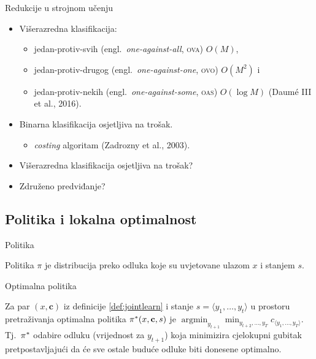 \documentclass{beamer}
\makeatletter
\newcommand{\engla}[2]{(engl.~\emph{#1}, \textsc{#2})}
\def\@fnsymbol#1{\ensuremath{\ifcase#1\or *\or \dagger\or \ddagger\or
   \mathsection\or \mathparagraph\or \|\or **\or \dagger\dagger
   \or \ddagger\ddagger \else\@ctrerr\fi}}
\newcommand{\ssymbol}[1]{^{\@fnsymbol{#1}}}
\DeclareMathOperator*{\argmin}{argmin}
\makeatother
\begin{document}
\begin{frame}{Redukcije u strojnom učenju}
  \begin{itemize}
  \item<1-> Višerazredna klasifikacija:
  \begin{itemize}
    \item<1-> jedan-protiv-svih   \engla{one-against-all}{ova} $O(M)$,
    \item<1-> jedan-protiv-drugog \engla{one-against-one}{ovo} $O(M^2)$ i
    \item<1-> jedan-protiv-nekih  \engla{one-against-some}{oas} $O(\log M)$
    (Daumé III et al., 2016).
  \end{itemize}
  \item<2-> Binarna klasifikacija osjetljiva na trošak.
  \begin{itemize}
    \item<2-> \textit{costing} algoritam (Zadrozny et al., 2003).
  \end{itemize}
  \item<3-> Višerazredna klasifikacija osjetljiva na trošak?
  \item<4-> Združeno predviđanje?
  \end{itemize}
\end{frame}

\subsection{Politika i lokalna optimalnost}
\begin{frame}{Politika}
  \begin{definition}
    Politika $\pi$ je distribucija preko odluka koje su uvjetovane ulazom $x$ i
    stanjem $s$.
  \end{definition}
\end{frame}

\begin{frame}{Optimalna politika}
  \begin{definition}

    Za par $(x, \mathbf{c})$ iz definicije \ref{def:jointlearn} i stanje $s =
    \langle y_1, \ldots, y_t \rangle$ u prostoru pretraživanja optimalna
    politika $\pi\ssymbol{1}(x, \mathbf{c}, s)$ je $\argmin_{y_{t+1}}
    \min_{y_{t+2}, \ldots, y_T} c_{\langle y_1, \ldots, y_T \rangle}$.
    Tj.~$\pi\ssymbol{1}$ odabire odluku (vrijednost za $y_{t+1}$) koja
    minimizira cjelokupni gubitak pretpostavljajući da će sve ostale buduće
    odluke biti donesene optimalno.

  \end{definition}
\end{frame}
\end{document}
